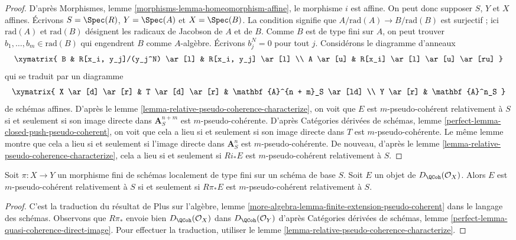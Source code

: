 \begin{proof}
D'après Morphismes, lemme \ref{morphisms-lemma-homeomorphism-affine},
le morphisme $i$ est affine. On peut donc supposer $S$, $Y$ et $X$ affines.
Écrivons $S = \Spec(R)$, $Y = \Spec(A)$ et $X = \Spec(B)$.
La condition signifie que $A/\text{rad}(A) \to B/\text{rad}(B)$ est
surjectif ; ici $\text{rad}(A)$ et $\text{rad}(B)$ désignent
les radicaux de Jacobson de $A$ et de $B$.
Comme $B$ est de type fini sur $A$, on peut trouver
$b_1, \ldots, b_m \in \text{rad}(B)$ qui engendrent $B$ comme
$A$-algèbre. Écrivons $b_j^N = 0$ pour tout $j$. Considérons le diagramme
d'anneaux
$$
\xymatrix{
B & R[x_i, y_j]/(y_j^N) \ar[l] & R[x_i, y_j] \ar[l] \\
A \ar[u] & R[x_i] \ar[l] \ar[u] \ar[ru]
}
$$
qui se traduit par un diagramme
$$
\xymatrix{
X \ar[d] \ar[r] & T \ar[d] \ar[r] & \mathbf{A}^{n + m}_S \ar[ld] \\
Y \ar[r] & \mathbf{A}^n_S
}
$$
de schémas affines. D'après le lemme \ref{lemma-relative-pseudo-coherence-characterize},
on voit que $E$ est $m$-pseudo-cohérent relativement à $S$ si et seulement si son
image directe dans $\mathbf{A}^{n + m}_S$ est $m$-pseudo-cohérente.
D'après Catégories dérivées de schémas, lemme
\ref{perfect-lemma-closed-push-pseudo-coherent},
on voit que cela a lieu si et seulement si son image directe dans $T$ est
$m$-pseudo-cohérente. Le même lemme montre que cela a lieu si et seulement si
l'image directe dans $\mathbf{A}^n_S$ est $m$-pseudo-cohérente.
De nouveau, d'après le
lemme \ref{lemma-relative-pseudo-coherence-characterize},
cela a lieu si et seulement si $Ri_*E$ est $m$-pseudo-cohérent relativement à $S$.
\end{proof}

\begin{lemma}
\label{lemma-finite-morphism-relative-pseudo-coherence}
Soit $\pi : X \to Y$ un morphisme fini de schémas localement de type
fini sur un schéma de base $S$. Soit $E$ un objet de
$D_\QCoh(\mathcal{O}_X)$. Alors $E$ est $m$-pseudo-cohérent
relativement à $S$ si et seulement si $R\pi_*E$ est $m$-pseudo-cohérent
relativement à $S$.
\end{lemma}

\begin{proof}
C'est la traduction du résultat de
Plus sur l'algèbre, lemme
\ref{more-algebra-lemma-finite-extension-pseudo-coherent}
dans le langage des schémas. Observons que $R\pi_*$ envoie bien
$D_\QCoh(\mathcal{O}_X)$ dans $D_\QCoh(\mathcal{O}_Y)$
d'après Catégories dérivées de schémas, lemme
\ref{perfect-lemma-quasi-coherence-direct-image}.
Pour effectuer la traduction, utiliser le
lemme \ref{lemma-relative-pseudo-coherence-characterize}.
\end{proof}

